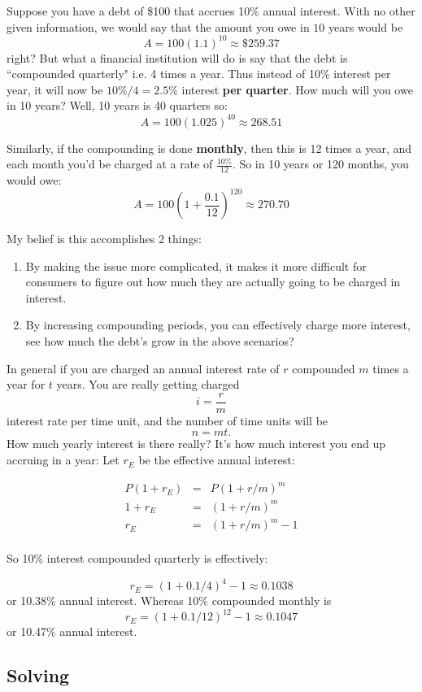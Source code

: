Suppose you have a debt of \$100 that accrues 10\% annual interest.  With no other given information, we would say that the amount you owe in $10$ years would be $$A=100(1.1)^{10}\approx \$259.37$$  right?  But what a financial institution will do is say that the debt is ``compounded quarterly" i.e. 4 times a year.  Thus instead of 10\% interest per year, it will now be $10\%/4=2.5\%$ interest \textbf{ per quarter}.  How much will you owe in 10 years?  Well, 10 years is 40 quarters so: $$A=100(1.025)^{40}\approx 268.51$$

Similarly, if the compounding is done  \textbf{ monthly}, then this is 12 times a year, and each month you'd be charged at a rate of $\frac{10\%}{12}$.  So in 10 years or 120 months, you would owe: $$A=100(1+\frac{0.1}{12})^{120}\approx 270.70$$

My belief is this accomplishes 2 things:

\begin{enumerate}
\item By making the issue more complicated, it makes it more difficult for consumers to figure out how much they are actually going to be charged in interest.
\item By increasing compounding periods, you can effectively charge more interest, see how much the debt's grow in the above scenarios?
\end{enumerate}

In general if you are charged an annual interest rate of $r$ compounded $m$ times a year for $t$ years.  You are really getting charged $$i=\frac{r}{m}$$ interest rate per time unit, and the number of time units will be $$n=mt.$$  How much yearly interest is there really?  It's how much interest you end up accruing in a year:  Let $r_E$ be the effective annual interest:

\begin{eqnarray*}
P(1+r_E)&=&P(1+r/m)^{m}\\
1+r_E&=&(1+r/m)^{m}\\
r_E&=&(1+r/m)^{m}-1\\
\end{eqnarray*}


So 10\% interest compounded quarterly is effectively:

$$r_E=(1+0.1/4)^4-1\approx0.1038$$ or 10.38\% annual interest.  Whereas 10\% compounded monthly is $$r_E=(1+0.1/12)^{12}-1\approx 0.1047$$ or 10.47\% annual interest.




\subsection{Solving}

